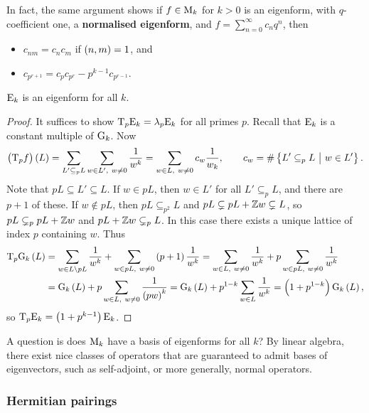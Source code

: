 In fact, the same argument shows if $ f \in \mathrm{M}_k $ for $ k > 0 $ is an eigenform, with $ q $-coefficient one, a \textbf{normalised eigenform}, and $ f = \sum_{n = 0}^\infty c_nq^n $, then
\begin{itemize}
\item $ c_{nm} = c_nc_m $ if $ \br{n, m} = 1 $, and
\item $ c_{p^{r + 1}} = c_pc_{p^r} - p^{k - 1}c_{p^{r - 1}} $.
\end{itemize}

\begin{proposition}
$ \mathrm{E}_k $ is an eigenform for all $ k $.
\end{proposition}

\begin{proof}
It suffices to show $ \mathrm{T}_p\mathrm{E}_k = \lambda_p\mathrm{E}_k $ for all primes $ p $. Recall that $ \mathrm{E}_k $ is a constant multiple of $ \mathrm{G}_k $. Now
$$ \br{\T_pf}\br{L} = \sum_{L' \subseteq_p L} \sum_{w \in L', \ w \ne 0} \dfrac{1}{w^k} = \sum_{w \in L, \ w \ne 0} c_w\dfrac{1}{w_k}, \qquad c_w = \#\cbr{L' \subseteq_p L \st w \in L'}. $$
Note that $ pL \subseteq L' \subseteq L $. If $ w \in pL $, then $ w \in L' $ for all $ L' \subseteq_p L $, and there are $ p + 1 $ of these. If $ w \notin pL $, then $ pL \subseteq_{p^2} L $ and $ pL \subsetneq pL + \mathbb{Z} w \subsetneq L $, so $ pL \subsetneq_p pL + \mathbb{Z} w $ and $ pL + \mathbb{Z} w \subsetneq_p L $. In this case there exists a unique lattice of index $ p $ containing $ w $. Thus
\begin{align*}
\T_p\G_k\br{L}
& = \sum_{w \in L \setminus pL} \dfrac{1}{w^k} + \sum_{w \in pL, \ w \ne 0} \br{p + 1}\dfrac{1}{w^k}
= \sum_{w \in L, \ w \ne 0} \dfrac{1}{w^k} + p\sum_{w \in pL, \ w \ne 0} \dfrac{1}{w^k} \\
& = \G_k\br{L} + p\sum_{w \in L, \ w \ne 0} \dfrac{1}{\br{pw}^k}
= \G_k\br{L} + p^{1 - k}\sum_{w \in L} \dfrac{1}{w^k}
= \br{1 + p^{1 - k}}\G_k\br{L},
\end{align*}
so $ \T_p\E_k = \br{1 + p^{k - 1}}\E_k $.
\end{proof}

A question is does $ \mathrm{M}_k $ have a basis of eigenforms for all $ k $? By linear algebra, there exist nice classes of operators that are guaranteed to admit bases of eigenvectors, such as self-adjoint, or more generally, normal operators.

\pagebreak

\subsubsection{Hermitian pairings}

